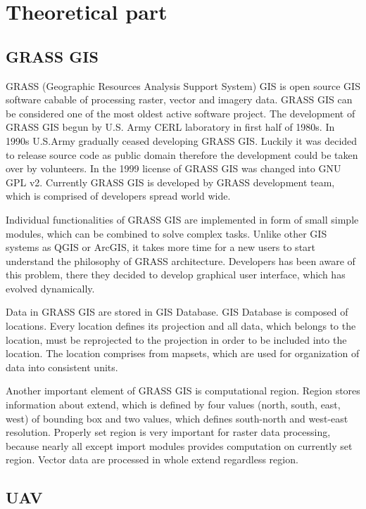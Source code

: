 \documentclass[a4paper,12pt]{article}
\begin{document}
\newpage

\section{Theoretical part}


\subsection{GRASS GIS}

GRASS (Geographic Resources Analysis Support System) GIS is open source GIS software cabable of processing raster, vector and imagery data. 
GRASS GIS can be considered one of 
the most oldest active software project. The development of GRASS GIS begun by U.S. Army CERL  laboratory
in first half of 1980s. In 1990s U.S.Army gradually ceased developing GRASS GIS. Luckily it was decided to 
release source code as public domain therefore the development could be taken over by volunteers. In the 1999 license 
of GRASS GIS was changed into GNU GPL v2. Currently GRASS GIS is developed by GRASS development 
team, which is comprised of developers spread world wide. 
 
Individual functionalities of GRASS GIS are implemented in form of small simple modules, which 
can be combined to solve complex tasks.
Unlike other GIS systems as QGIS or ArcGIS, it takes 
more time for a new users to start understand the philosophy of GRASS architecture. Developers 
has been aware of this problem, there they decided to develop graphical user interface, which 
has evolved dynamically.

Data in GRASS GIS are stored in GIS Database. GIS Database is composed of locations. Every location 
defines its projection and all data, which belongs to the location, must be reprojected to 
the projection in order to be included into the location. The location comprises from mapsets, which are used for organization 
of data into consistent units. 

Another important element of GRASS GIS is computational region. Region stores information about 
extend, which is defined by four values (north, south, east, west) of bounding box and 
two values, which defines south-north and west-east resolution. Properly set region is 
very important for raster data processing, because nearly all except import modules provides computation 
on currently set region. Vector data are processed in whole extend regardless region.

\subsection{UAV}
\end{document}
